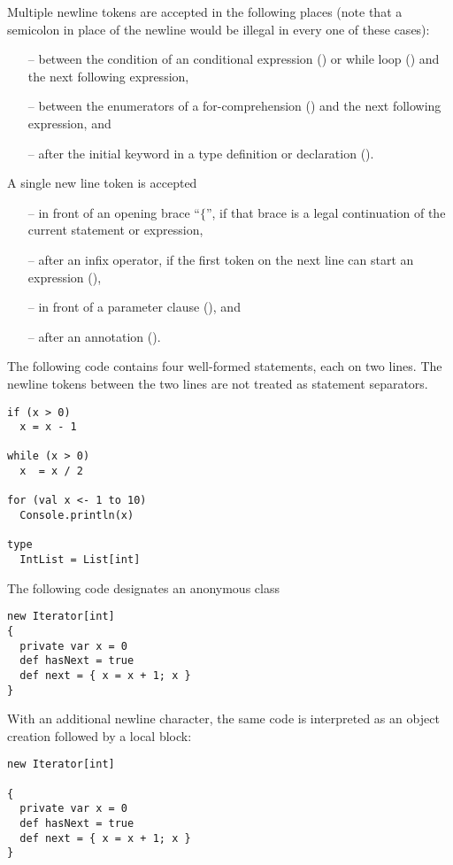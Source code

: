 Multiple newline tokens are accepted in the following places (note
that a semicolon in place of the newline would be illegal in every one
of these cases):
\begin{itemize}
\item[--]
between the condition of an conditional expression
() or while loop () and the next
following expression,
\item[--]
between the enumerators of a for-comprehension ()
and the next following expression, and
\item[--]
after the initial \lstinline@type@ keyword in a type definition or
declaration ().
\end{itemize}
A single new line token is accepted
\begin{itemize}
\item[--] 
  in front of an opening brace ``$\{$'', if that brace is a legal
  continuation of the current statement or expression,
\item[--]
  after an infix operator, if the first token on the next line can
  start an expression (),
\item[--]
  in front of a parameter clause (), and
\item[--]
  after an annotation ().
\end{itemize}  

\example The following code contains four well-formed statements, each
on two lines. The newline tokens between the two lines are not
treated as statement separators.
\begin{lstlisting}
if (x > 0)
  x = x - 1

while (x > 0)
  x  = x / 2

for (val x <- 1 to 10)
  Console.println(x)

type
  IntList = List[int]
\end{lstlisting}

\example The following code designates an anonymous class
\begin{lstlisting}
new Iterator[int] 
{
  private var x = 0
  def hasNext = true
  def next = { x = x + 1; x }
}
\end{lstlisting}

With an additional newline character, the same code is interpreted as
an object creation followed by a local block:

\begin{lstlisting}
new Iterator[int] 

{
  private var x = 0
  def hasNext = true
  def next = { x = x + 1; x }
}
\end{lstlisting}

